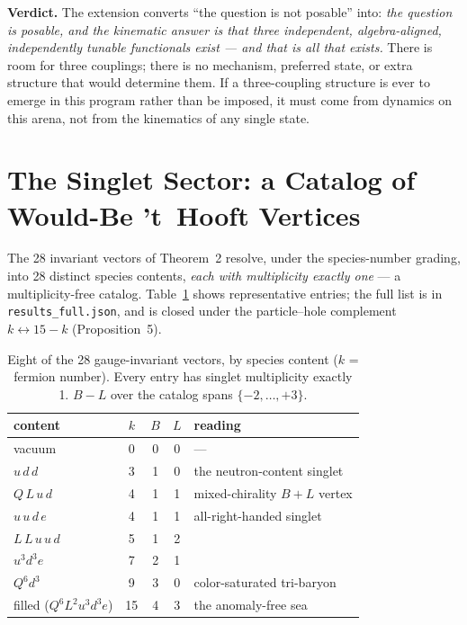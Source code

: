 \documentclass[11pt]{article}
\begin{document}
\medskip

\noindent\textbf{Verdict.} The extension converts ``the question is not posable'' \cite{p2} into: \emph{the question is posable, and the kinematic answer is that three independent, algebra-aligned, independently tunable functionals exist --- and that is all that exists.} There is room for three couplings; there is no mechanism, preferred state, or extra structure that would determine them. If a three-coupling structure is ever to emerge in this program rather than be imposed, it must come from dynamics on this arena, not from the kinematics of any single state.

\section{The Singlet Sector: a Catalog of Would-Be 't~Hooft Vertices}\label{sec:thooft}

The 28 invariant vectors of Theorem~2 resolve, under the species-number grading, into 28 distinct species contents, \emph{each with multiplicity exactly one} --- a multiplicity-free catalog. Table~\ref{tab:singlets} shows representative entries; the full list is in \texttt{results\_full.json}, and is closed under the particle--hole complement $k \leftrightarrow 15-k$ (Proposition~5).

\begin{table}[ht]
\centering
\small
\begin{tabular}{lcccl}
\toprule
content & $k$ & $B$ & $L$ & reading \\
\midrule
vacuum & 0 & 0 & 0 & --- \\
$u\,d\,d$ & 3 & 1 & 0 & the neutron-content singlet \\
$Q\,L\,u\,d$ & 4 & 1 & 1 & mixed-chirality $B{+}L$ vertex \\
$u\,u\,d\,e$ & 4 & 1 & 1 & all-right-handed singlet \\
$L\,L\,u\,u\,d$ & 5 & 1 & 2 & \\
$u^3 d^3 e$ & 7 & 2 & 1 & \\
$Q^6 d^3$ & 9 & 3 & 0 & color-saturated tri-baryon \\
filled ($Q^6 L^2 u^3 d^3 e$) & 15 & 4 & 3 & the anomaly-free sea \\
\bottomrule
\end{tabular}
\caption{Eight of the 28 gauge-invariant vectors, by species content ($k$ = fermion number). Every entry has singlet multiplicity exactly 1. $B-L$ over the catalog spans $\{-2,\ldots,+3\}$.}
\label{tab:singlets}
\end{table}
\end{document}
